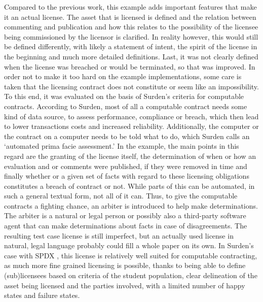 \documentclass[conference]{IEEEtran}
\begin{document}
Compared to the previous work, \cite{governatoriLegalContractsImperative2018} this example adds important features that make it an actual license. %
The asset that is licensed is defined and the relation between commenting and publication and how this relates to the possibility of the licensee being commissioned by the licensor is clarified.
In reality however, this would still be defined differently, with likely a statement of intent, the spirit of the license in the beginning and much more detailed definitions. Last, it was not clearly defined when the license was breached or would be terminated, so that was improved. %
In order not to make it too hard on the example implementations, some care is taken that the licensing contract does not constitute or seem like an impossibility. To this end, it was evaluated on the basis of Surden’s criteria for computable contracts. \cite{surdenArtificialIntelligenceLaw2019}
According to Surden, most of all a computable contract needs some kind of data source, to assess performance, compliance or breach, which then lead to lower transactions costs and increased reliability. Additionally, the computer or the contract on a computer needs to be told what to do, which Surden calls an ‘automated prima facie assessment.’ In the example, the main points in this regard are the granting of the license itself, the determination of when or how an evaluation and or comments were published, if they were removed in time and finally whether or a given set of facts with regard to these licensing obligations constitutes a breach of contract or not. While parts of this can be automated, in such a general textual form, not all of it can. Thus, to give the computable contracts a fighting chance, an arbiter is introduced to help make determinations. The arbiter is a natural or legal person or possibly also a third-party software agent that can make determinations about facts in case of disagreements. %
The resulting test case license is still %
imperfect, but an actually used license in natural, legal language probably could fill a whole paper on its own. In Surden’s case with SPDX \cite{odenceAdvancingSoftwarePackage2013}, this license is relatively well suited for computable contracting, as much more fine grained licensing is possible, thanks to being able to define (sub)licensees based on criteria of the student population, clear delineation of the asset being licensed and the parties involved, with a limited number of happy states and failure states.
\end{document}
